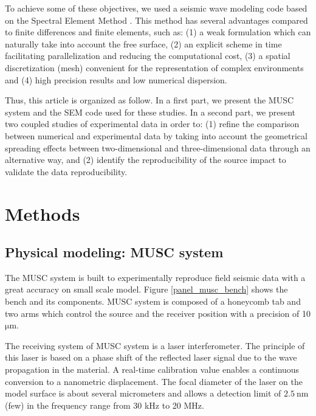 \documentclass[manuscript,revised]{geophysics}
\newcommand{\twod}{two-dimensional }
\newcommand{\thrd}{three-dimensional }
\begin{document}
\noindent To achieve some of these objectives, we used a seismic wave modeling code based on the Spectral Element Method \citep{Komatitsch_SEM_1998,Komatitsch_ISM_1999,Komatitsch_SEM_2005,Festa_PML_2005}. This method has several advantages compared to finite differences and finite elements, such as: (1) a weak formulation which can naturally take into account the free surface, (2) an explicit scheme in time facilitating parallelization and reducing the computational cost, (3) a spatial discretization (mesh) convenient for the representation of complex environments and (4) high precision results and low numerical dispersion.


\noindent Thus, this article is organized as follow. In a first part, we present the MUSC system and the SEM code used for these studies. In a second part, we present two coupled studies of experimental data in order to: (1) refine the comparison between numerical and experimental data by taking into account the geometrical spreading effects between \twod and \thrd data through an alternative way, and (2) identify the reproducibility of the source impact to validate the data reproducibility.


\section{Methods}

\subsection{Physical modeling: MUSC system}

\noindent The MUSC system \citep{Bretaudeau_SSA_2008b,Bretaudeau_SSM_2011,Bretaudeau_FWI_2013} is built to experimentally reproduce field seismic data with a great accuracy on small scale model. Figure \ref{panel_musc_bench} shows the bench and its components. MUSC system is composed of a honeycomb tab and two arms which control the source and the receiver position with a precision of 10 $\mathrm{\mu m}$.

\noindent The receiving system of MUSC system is a laser interferometer. The principle of this laser is based on a phase shift of the reflected laser signal due to the wave propagation in the material. A real-time calibration value enables a continuous conversion to a nanometric displacement. The focal diameter of the laser on the model surface is about several micrometers and allows a detection limit of $\mathrm{2.5\ nm}$ (few) in the frequency range from 30 kHz to 20 MHz.
\end{document}
